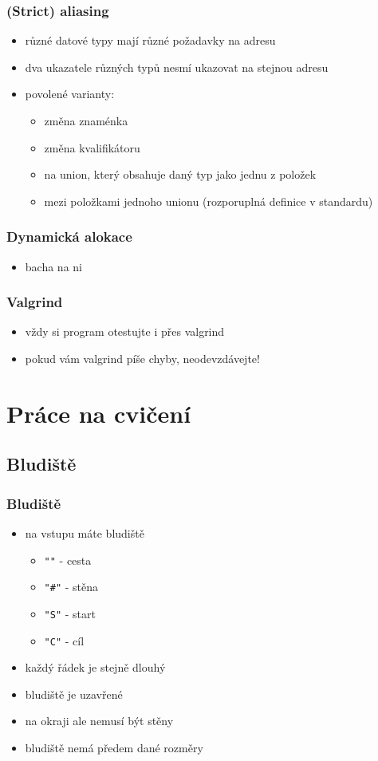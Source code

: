 \begin{frame}
	\frametitle{(Strict) aliasing}
	\begin{itemize}
		\item{různé datové typy mají různé požadavky na adresu}
		\item{dva ukazatele různých typů nesmí ukazovat na stejnou adresu}
		\item{povolené varianty:}
		\begin{itemize}
			\item{změna znaménka}
			\item{změna kvalifikátoru}
			\item{na union, který obsahuje daný typ jako jednu z položek}
			\item{mezi položkami jednoho unionu (rozporuplná definice v standardu)}
		\end{itemize}
	\end{itemize}
\end{frame}

\begin{frame}
	\frametitle{Dynamická alokace}
	\begin{itemize}
		\item{bacha na ni}
	\end{itemize}
\end{frame}

\begin{frame}
	\frametitle{Valgrind}
	\begin{itemize}
		\item{vždy si program otestujte i přes valgrind}
		\item{pokud vám valgrind píše chyby, neodevzdávejte!}
	\end{itemize}
\end{frame}

\section{Práce na cvičení}
\subsection{Bludiště}

\begin{frame}
	\frametitle{Bludiště}
	\begin{itemize}
		\item{na vstupu máte bludiště}
		\begin{itemize}
			\item{\texttt{"\space"} - cesta}
			\item{\texttt{"\#"} - stěna}
			\item{\texttt{"S"} - start}
			\item{\texttt{"C"} - cíl}
		\end{itemize}
		\item{každý řádek je stejně dlouhý}
		\item{bludiště je uzavřené}
		\item{na okraji ale nemusí být stěny}
		\item{bludiště nemá předem dané rozměry}
	\end{itemize}
\end{frame}

